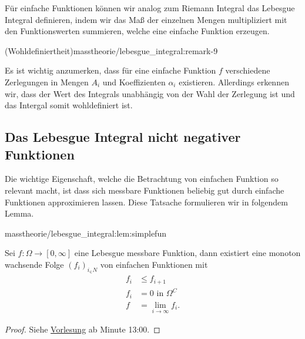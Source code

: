 \documentclass[letterpaper,10pt,german]{jupyterBook}
\begin{document}
\par
Für einfache Funktionen können wir analog zum Riemann Integral das Lebesgue Integral definieren, indem wir das Maß der einzelnen Mengen multipliziert mit den Funktionswerten summieren, welche eine einfache Funktion erzeugen.
\begin{remark}{(Wohldefiniertheit)}{masstheorie/lebesgue_integral:remark-9}



\par
Es ist wichtig anzumerken, dass für eine einfache Funktion \(f\) verschiedene Zerlegungen in Mengen \(A_i\) und Koeffizienten \(\alpha_i\) existieren. Allerdings erkennen wir, dass der Wert des Integrals unabhängig von der Wahl der Zerlegung ist und das Intergal somit wohldefiniert ist.
\end{remark}


\subsection{Das Lebesgue Integral nicht negativer Funktionen}
\label{\detokenize{masstheorie/lebesgue_integral:das-lebesgue-integral-nicht-negativer-funktionen}}
\par
Die wichtige Eigenschaft, welche die Betrachtung von einfachen Funktion so relevant macht, ist dass sich messbare Funktionen beliebig gut durch einfache Funktionen approximieren lassen. Diese Tatsache formulieren wir in folgendem Lemma.
\begin{lemma}{}{masstheorie/lebesgue_integral:lem:simplefun}



\par
Sei \(f \colon \Omega \to [0,\infty]\) eine Lebesgue messbare Funktion, dann existiert eine monoton wachsende Folge \((f_i)_{i_\in N}\) von einfachen Funktionen mit
\begin{align*}
f_i&\leq f_{i+1}\\
f_i &= 0\text{ in }\Omega^C\\
f&=\lim_{i\to\infty} f_i.
\end{align*}\end{lemma}

\begin{proof}
 Siehe \href{https://www.fau.tv/clip/id/40589}{Vorlesung} ab Minute 13:00.
\end{proof}
\end{document}

